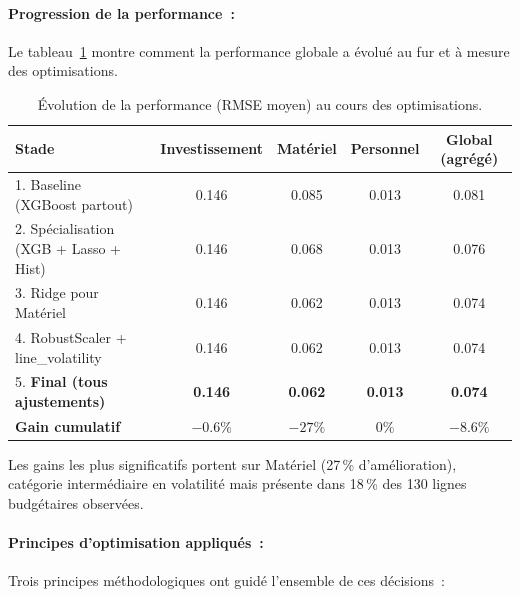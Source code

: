 \paragraph{Progression de la performance~:}

Le tableau~\ref{tab:performance-progression} montre comment la performance globale
a \'evolu\'e au fur et \`a mesure des optimisations.

\begin{table}[H]
\centering\small
\caption{\'Evolution de la performance (RMSE moyen) au cours des optimisations.}
\label{tab:performance-progression}
\begin{tabular}{@{}lcccc@{}}
\toprule
\textbf{Stade} & \textbf{Investissement} & \textbf{Mat\'eriel} & \textbf{Personnel} & \textbf{Global (agr\'eg\'e)} \\
\midrule
1. Baseline (XGBoost partout) & 0.146 & 0.085 & 0.013 & 0.081 \\
2. Sp\'ecialisation (XGB + Lasso + Hist) & 0.146 & 0.068 & 0.013 & 0.076 \\
3. Ridge pour Mat\'eriel & 0.146 & 0.062 & 0.013 & 0.074 \\
4. RobustScaler + line\_volatility & 0.146 & 0.062 & 0.013 & 0.074 \\
5. \textbf{Final (tous ajustements)} & \textbf{0.146} & \textbf{0.062} & \textbf{0.013} & \textbf{0.074} \\
\midrule
\bfseries Gain cumulatif &  $-0.6\%$ & $-27\%$ & $0\%$ & $\mathbf{-8.6\%}$ \\
\bottomrule
\end{tabular}
\end{table}

\noindent
Les gains les plus significatifs portent sur Mat\'eriel (27\,\% d'am\'elioration),
cat\'egorie interm\'ediaire en volatilit\'e mais pr\'esente dans 18\,\% des 130
lignes budg\'etaires observ\'ees.

\paragraph{Principes d'optimisation appliqu\'es~:}

Trois principes m\'ethodologiques ont guid\'e l'ensemble de ces d\'ecisions~:

